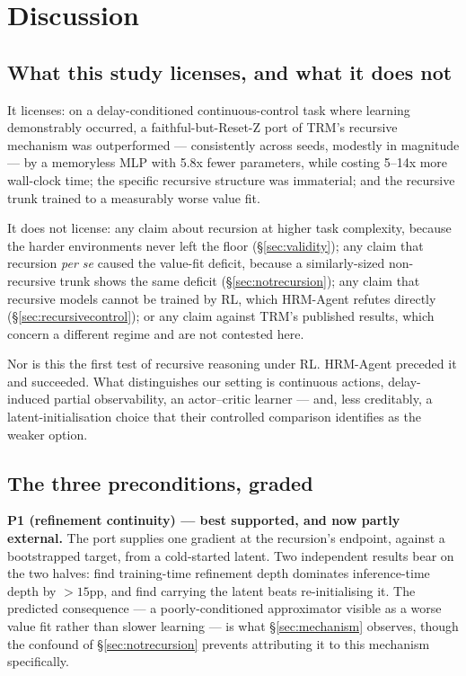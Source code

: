 \documentclass[11pt]{article}
\begin{document}
\section{Discussion}
\label{sec:discussion}

\subsection{What this study licenses, and what it does not}

It licenses: on a delay-conditioned continuous-control task where learning demonstrably occurred, a faithful-but-Reset-Z port of TRM's recursive mechanism was outperformed --- consistently across seeds, modestly in magnitude --- by a memoryless MLP with 5.8x fewer parameters, while costing 5--14x more wall-clock time; the specific recursive structure was immaterial; and the recursive trunk trained to a measurably worse value fit.

It does not license: any claim about recursion at higher task complexity, because the harder environments never left the floor (\S\ref{sec:validity}); any claim that recursion \emph{per se} caused the value-fit deficit, because a similarly-sized non-recursive trunk shows the same deficit (\S\ref{sec:notrecursion}); any claim that recursive models cannot be trained by RL, which HRM-Agent refutes directly (\S\ref{sec:recursivecontrol}); or any claim against TRM's published results, which concern a different regime and are not contested here.

Nor is this the first test of recursive reasoning under RL. HRM-Agent preceded it and succeeded. What distinguishes our setting is continuous actions, delay-induced partial observability, an actor--critic learner --- and, less creditably, a latent-initialisation choice that their controlled comparison identifies as the weaker option.

\subsection{The three preconditions, graded}

\textbf{P1 (refinement continuity) --- best supported, and now partly external.} The port supplies one gradient at the recursion's endpoint, against a bootstrapped target, from a cold-started latent. Two independent results bear on the two halves: \citet{arcprize2025hrm} find training-time refinement depth dominates inference-time depth by $>15$pp, and \citet{dang2025hrmagent} find carrying the latent beats re-initialising it. The predicted consequence --- a poorly-conditioned approximator visible as a worse value fit rather than slower learning --- is what \S\ref{sec:mechanism} observes, though the confound of \S\ref{sec:notrecursion} prevents attributing it to this mechanism specifically.
\end{document}

